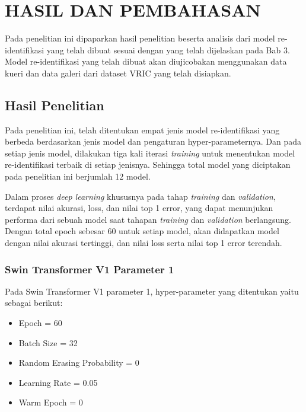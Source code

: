 \chapter{HASIL DAN PEMBAHASAN}
\label{chap:hasildanpembahasan}


Pada penelitian ini dipaparkan hasil penelitian beserta analisis dari model re-identifikasi yang telah dibuat sesuai dengan 
yang telah dijelaskan pada Bab 3. Model re-identifikasi yang telah dibuat akan diujicobakan menggunakan data 
kueri dan data galeri dari dataset VRIC yang telah disiapkan. 

\section{Hasil Penelitian}
\label{sec:hasilpenelitian}

Pada penelitian ini, telah ditentukan empat jenis model re-identifikasi yang berbeda \linebreak berdasarkan jenis model dan pengaturan 
hyper-parameternya. Dan pada setiap jenis model, dilakukan tiga kali iterasi \emph{training} untuk menentukan model re-identifikasi 
terbaik di setiap jenisnya. Sehingga total model yang diciptakan pada penelitian ini berjumlah 12 model. 

Dalam proses \emph{deep learning} khususnya pada tahap \emph{training} dan \emph{validation}, terdapat nilai  akurasi, loss, dan 
nilai top 1 error, yang dapat menunjukan performa dari sebuah model saat tahapan \emph{training} dan \emph{validation} berlangsung. 
Dengan total epoch sebesar 60 untuk setiap model, akan didapatkan model dengan nilai akurasi tertinggi, dan nilai loss serta nilai 
top 1 error terendah. 

\subsection{Swin Transformer V1 Parameter 1}

Pada Swin Transformer V1 parameter 1, hyper-parameter yang ditentukan yaitu sebagai berikut:

\begin{itemize}[nolistsep]
  \item Epoch = 60
  \item Batch Size = 32
  \item Random Erasing Probability = 0
  \item Learning Rate = 0.05
  \item Warm Epoch = 0
\end{itemize}

